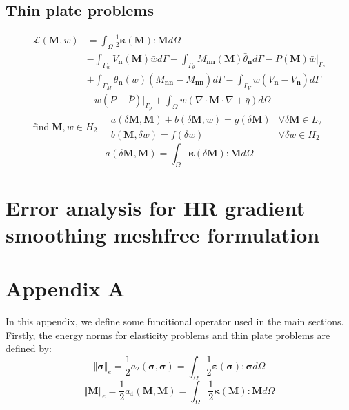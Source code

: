 \documentclass{article}
\begin{document}
\subsection{Thin plate problems}
\begin{equation}\label{plateenergy}
    \begin{split}
        \mathcal L(\boldsymbol M, w) 
        &= \int_{\Omega} \frac{1}{2} \boldsymbol \kappa(\boldsymbol M) : \boldsymbol M d\Omega \\ 
        &- \int_{\Gamma_w} V_{\boldsymbol n}(\boldsymbol M) \bar{w} d\Gamma + \int_{\Gamma_\theta} M_{\boldsymbol{nn}}(\boldsymbol M)\bar{\theta}_{\boldsymbol n} d\Gamma - P(\boldsymbol M)\bar{w}\vert_{\Gamma_c} \\
        &+ \int_{\Gamma_M} \theta_{\boldsymbol n}(w)(M_{\boldsymbol{nn}}-\bar{M}_{\boldsymbol{nn}})d\Gamma - \int_{\Gamma_V} w(V_{\boldsymbol n} - \bar{V}_{\boldsymbol n})d\Gamma \\ 
        &- w(P-\bar P)\vert_{\Gamma_p} + \int_{\Omega} w(\nabla \cdot \boldsymbol M \cdot \nabla + \bar{q})d\Omega
    \end{split}
\end{equation}
\begin{equation}
    \mathrm{find} \; \boldsymbol M, w \in H_2 \quad
    \begin{array}{rr}
    a(\delta \boldsymbol M,\boldsymbol M) + b(\delta \boldsymbol M, w) = g(\delta \boldsymbol M) & \forall \delta \boldsymbol M \in L_2 \\
    b(\boldsymbol M, \delta w) = f(\delta w) & \forall \delta w \in H_2
    \end{array}
\end{equation}
\begin{equation}
    a(\delta \boldsymbol M,\boldsymbol M) = \int_{\Omega} \boldsymbol \kappa(\delta \boldsymbol M): \boldsymbol M d\Omega
\end{equation}

\section{Error analysis for HR gradient smoothing meshfree formulation}
\section*{Appendix A}
In this appendix, we define some funcitional operator used in the main sections. Firstly, the energy norms for elasticity problems and thin plate problems are defined by:
\begin{equation}
    \Vert \boldsymbol{\sigma} \Vert_e = \frac{1}{2} a_{2}(\boldsymbol{\sigma},\boldsymbol{\sigma}) = \int_{\Omega} \frac{1}{2} \boldsymbol{\varepsilon}(\boldsymbol{\sigma}) : \boldsymbol{\sigma} d\Omega
\end{equation} 
\begin{equation}
    \Vert \boldsymbol{M} \Vert_e = \frac{1}{2}a_4(\boldsymbol{M}, \boldsymbol{M}) = \int_{\Omega} \frac{1}{2} \boldsymbol{\kappa}(\boldsymbol{M}) : \boldsymbol{M} d\Omega
\end{equation}

\end{document}
